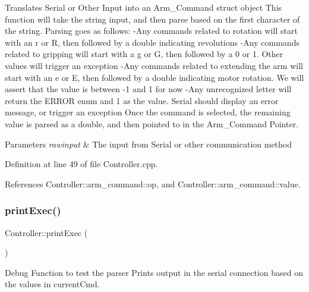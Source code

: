 Translates Serial or Other Input into an Arm\+\_\+\+Command struct object This function will take the string input, and then parse based on the first character of the string. Parsing goes as follows\+: -\/\+Any commands related to rotation will start with an \textquotesingle{}r\textquotesingle{} or \textquotesingle{}R\textquotesingle{}, then followed by a double indicating revolutions -\/\+Any commands related to gripping will start with a \textquotesingle{}g\textquotesingle{} or \textquotesingle{}G\textquotesingle{}, then followed by a 0 or 1. Other values will trigger an exception -\/\+Any commands related to extending the arm will start with an \textquotesingle{}e\textquotesingle{} or \textquotesingle{}E\textquotesingle{}, then followed by a double indicating motor rotation. We will assert that the value is between -\/1 and 1 for now -\/\+Any unrecognized letter will return the E\+R\+R\+OR enum and 1 as the value. Serial should display an error message, or trigger an exception Once the command is selected, the remaining value is parsed as a double, and then pointed to in the Arm\+\_\+\+Command Pointer. 


\begin{DoxyParams}{Parameters}
{\em rawinput} & The input from Serial or other communication method \\
\hline
\end{DoxyParams}


Definition at line 49 of file Controller.\+cpp.



References Controller\+::arm\+\_\+command\+::op, and Controller\+::arm\+\_\+command\+::value.

\mbox{\label{class_controller_a8ad1d152a91997ab3825f32d2dcecfd4}} 
\subsubsection{\texorpdfstring{print\+Exec()}{printExec()}}
{\footnotesize\ttfamily Controller\+::print\+Exec (\begin{DoxyParamCaption}{ }\end{DoxyParamCaption})}



Debug Function to test the parser Prints output in the serial connection based on the values in current\+Cmd. 

